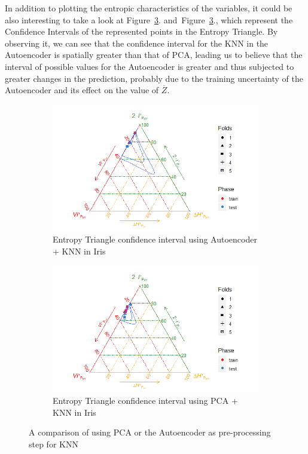 In addition to plotting the entropic characteristics of the variables, it could be also interesting to take a look at Figure~\ref{fig:figure_Knn_Iris_ET}. and~Figure~\ref{fig:figure_Knn_Iris_ET}., which represent the Confidence Intervals of the represented points in the Entropy Triangle. By observing it, we can see that the confidence interval for the KNN in the Autoencoder is spatially greater than that of PCA, leading us to believe that the interval of possible values for the Autoencoder is greater and thus subjected to greater changes in the prediction, probably due to the training uncertainty of the Autoencoder and its effect on the value of $\overline{Z}$. 
\begin{figure}[H]
\begin{subfigure}{1\textwidth}  
	\centering
	\includegraphics[width=\linewidth]{Figuras_tfg/ET_knn_iris_auto_confidence}
	\caption{Entropy Triangle confidence interval using Autoencoder + KNN in Iris}
	\label{fig:figure_Knn_Iris_ET_Auto_Confidence}
\end{subfigure}

\begin{subfigure}{1\textwidth}  
	\centering
	\includegraphics[width=\linewidth]{Figuras_tfg/ET_knn_iris_pca_confidence}
	\caption{Entropy Triangle confidence interval using PCA + KNN in Iris}
	\label{fig:figure_Knn_Iris_ET_PCA_Confidence}
\end{subfigure}
\caption{A comparison of using PCA or the Autoencoder as pre-processing step for KNN}
\label{fig:figure_Knn_Iris_ET}
\end{figure}



